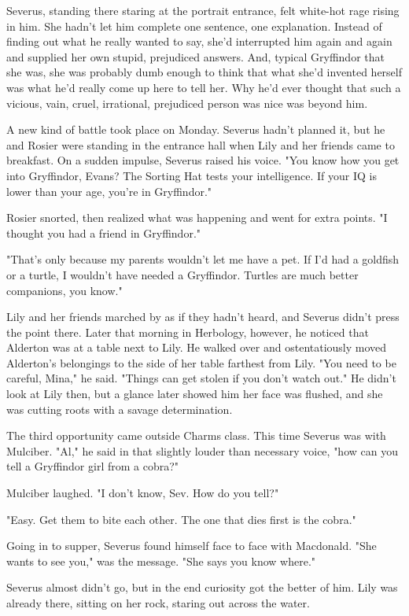 Severus, standing there staring at the portrait entrance, felt white-hot rage rising in him. She hadn't let him complete one sentence, one explanation. Instead of finding out what he really wanted to say, she'd interrupted him again and again and supplied her own stupid, prejudiced answers. And, typical Gryffindor that she was, she was probably dumb enough to think that what she'd invented herself was what he'd really come up here to tell her. Why he'd ever thought that such a vicious, vain, cruel, irrational, prejudiced person was nice was beyond him.

A new kind of battle took place on Monday. Severus hadn't planned it, but he and Rosier were standing in the entrance hall when Lily and her friends came to breakfast. On a sudden impulse, Severus raised his voice. "You know how you get into Gryffindor, Evans? The Sorting Hat tests your intelligence. If your IQ is lower than your age, you're in Gryffindor."

Rosier snorted, then realized what was happening and went for extra points. "I thought you had a friend in Gryffindor."

"That's only because my parents wouldn't let me have a pet. If I'd had a goldfish or a turtle, I wouldn't have needed a Gryffindor. Turtles are much better companions, you know."

Lily and her friends marched by as if they hadn't heard, and Severus didn't press the point there. Later that morning in Herbology, however, he noticed that Alderton was at a table next to Lily. He walked over and ostentatiously moved Alderton's belongings to the side of her table farthest from Lily. "You need to be careful, Mina," he said. "Things can get stolen if you don't watch out." He didn't look at Lily then, but a glance later showed him her face was flushed, and she was cutting roots with a savage determination.

The third opportunity came outside Charms class. This time Severus was with Mulciber. "Al," he said in that slightly louder than necessary voice, "how can you tell a Gryffindor girl from a cobra?"

Mulciber laughed. "I don't know, Sev. How do you tell?"

"Easy. Get them to bite each other. The one that dies first is the cobra."

Going in to supper, Severus found himself face to face with Macdonald. "She wants to see you," was the message. "She says you know where."

Severus almost didn't go, but in the end curiosity got the better of him. Lily was already there, sitting on her rock, staring out across the water.

